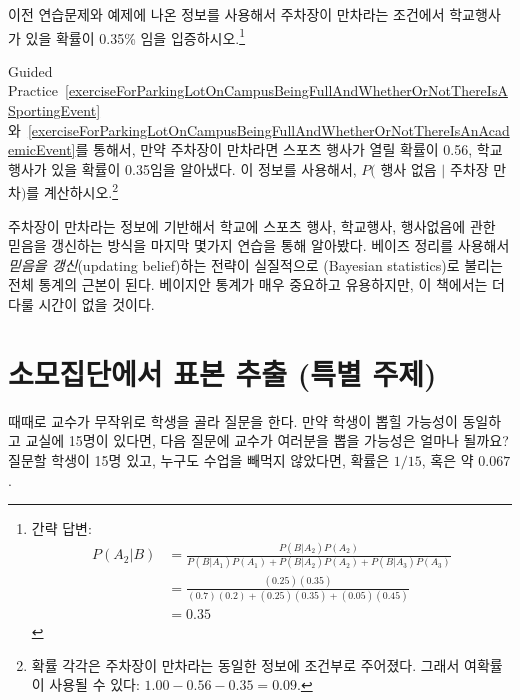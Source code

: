 \begin{exercise} \label{exerciseForParkingLotOnCampusBeingFullAndWhetherOrNotThereIsAnAcademicEvent}
이전 연습문제와 예제에 나온 정보를 사용해서 주차장이 만차라는 조건에서 학교행사가 있을 확률이 0.35\% 임을 입증하시오.\footnote{간략 답변:
\begin{align*}
P(A_2 | B) &= \frac{P(B | A_2) P(A_2)}{P(B | A_1) P(A_1) + P(B | A_2) P(A_2) + P(B | A_3) P(A_3)} \\
		&= \frac{(0.25)(0.35)}{(0.7)(0.2) + (0.25)(0.35) + (0.05)(0.45)} \\
		&= 0.35
\end{align*}}
\end{exercise}

\begin{exercise} \label{exerciseForParkingLotOnCampusBeingFullAndWhetherOrNotThereIsNoEvent}
Guided Practice~\ref{exerciseForParkingLotOnCampusBeingFullAndWhetherOrNotThereIsASportingEvent} 와~\ref{exerciseForParkingLotOnCampusBeingFullAndWhetherOrNotThereIsAnAcademicEvent}를 통해서, 만약 주차장이 만차라면 스포츠 행사가 열릴 확률이 0.56, 학교행사가 있을 확률이 0.35임을 알아냈다. 이 정보를 사용해서, $P($ 행사 없음 $|$ 주차장 만차$)$를 계산하시오.\footnote{
확률 각각은 주차장이 만차라는 동일한 정보에 조건부로 주어졌다. 그래서 여확률이 사용될 수 있다: $1.00 - 0.56 - 0.35 = 0.09$.}
\end{exercise}

주차장이 만차라는 정보에 기반해서 학교에 스포츠 행사, 학교행사, 행사없음에 관한 믿음을 갱신하는 방식을 마지막 몇가지 연습을 통해 알아봤다. 베이즈 정리를 사용해서 \emph{믿음을 갱신}(updating belief)하는 전략이 실질적으로 (Bayesian statistics)로 불리는 전체 통계의 근본이 된다. 베이지안 통계가 매우 중요하고 유용하지만, 이 책에서는 더 다룰 시간이 없을 것이다.



\section{소모집단에서 표본 추출 (특별 주제)}
\label{smallPop}

\begin{example}{때때로 교수가 무작위로 학생을 골라 질문을 한다. 만약 학생이 뽑힐 가능성이 동일하고 교실에 15명이 있다면, 다음 질문에 교수가 여러분을 뽑을 가능성은 얼마나 될까요?}
질문할 학생이 15명 있고, 누구도 수업을 빼먹지 않았다면, 확률은 $1/15$, 혹은 약 $0.067$.
\end{example}

